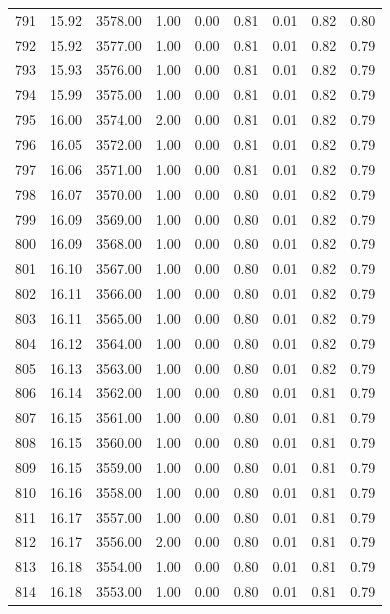 \documentclass{article}\usepackage[]{graphicx}\usepackage[]{color}
\begin{document}
\begin{longtable}{rrrrrrrrr}
  791 & 15.92 & 3578.00 & 1.00 & 0.00 & 0.81 & 0.01 & 0.82 & 0.80 \\ 
  792 & 15.92 & 3577.00 & 1.00 & 0.00 & 0.81 & 0.01 & 0.82 & 0.79 \\ 
  793 & 15.93 & 3576.00 & 1.00 & 0.00 & 0.81 & 0.01 & 0.82 & 0.79 \\ 
  794 & 15.99 & 3575.00 & 1.00 & 0.00 & 0.81 & 0.01 & 0.82 & 0.79 \\ 
  795 & 16.00 & 3574.00 & 2.00 & 0.00 & 0.81 & 0.01 & 0.82 & 0.79 \\ 
  796 & 16.05 & 3572.00 & 1.00 & 0.00 & 0.81 & 0.01 & 0.82 & 0.79 \\ 
  797 & 16.06 & 3571.00 & 1.00 & 0.00 & 0.81 & 0.01 & 0.82 & 0.79 \\ 
  798 & 16.07 & 3570.00 & 1.00 & 0.00 & 0.80 & 0.01 & 0.82 & 0.79 \\ 
  799 & 16.09 & 3569.00 & 1.00 & 0.00 & 0.80 & 0.01 & 0.82 & 0.79 \\ 
  800 & 16.09 & 3568.00 & 1.00 & 0.00 & 0.80 & 0.01 & 0.82 & 0.79 \\ 
  801 & 16.10 & 3567.00 & 1.00 & 0.00 & 0.80 & 0.01 & 0.82 & 0.79 \\ 
  802 & 16.11 & 3566.00 & 1.00 & 0.00 & 0.80 & 0.01 & 0.82 & 0.79 \\ 
  803 & 16.11 & 3565.00 & 1.00 & 0.00 & 0.80 & 0.01 & 0.82 & 0.79 \\ 
  804 & 16.12 & 3564.00 & 1.00 & 0.00 & 0.80 & 0.01 & 0.82 & 0.79 \\ 
  805 & 16.13 & 3563.00 & 1.00 & 0.00 & 0.80 & 0.01 & 0.82 & 0.79 \\ 
  806 & 16.14 & 3562.00 & 1.00 & 0.00 & 0.80 & 0.01 & 0.81 & 0.79 \\ 
  807 & 16.15 & 3561.00 & 1.00 & 0.00 & 0.80 & 0.01 & 0.81 & 0.79 \\ 
  808 & 16.15 & 3560.00 & 1.00 & 0.00 & 0.80 & 0.01 & 0.81 & 0.79 \\ 
  809 & 16.15 & 3559.00 & 1.00 & 0.00 & 0.80 & 0.01 & 0.81 & 0.79 \\ 
  810 & 16.16 & 3558.00 & 1.00 & 0.00 & 0.80 & 0.01 & 0.81 & 0.79 \\ 
  811 & 16.17 & 3557.00 & 1.00 & 0.00 & 0.80 & 0.01 & 0.81 & 0.79 \\ 
  812 & 16.17 & 3556.00 & 2.00 & 0.00 & 0.80 & 0.01 & 0.81 & 0.79 \\ 
  813 & 16.18 & 3554.00 & 1.00 & 0.00 & 0.80 & 0.01 & 0.81 & 0.79 \\ 
  814 & 16.18 & 3553.00 & 1.00 & 0.00 & 0.80 & 0.01 & 0.81 & 0.79 \\ 

\end{longtable}
\end{document}
